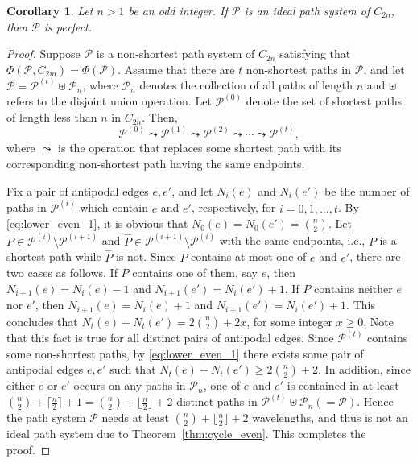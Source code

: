 \documentclass[journal,draftcls,onecolumn,12pt,twoside]{IEEEtran}
\newtheorem{corollary}[theorem]{\bf Corollary}
\begin{document}
\begin{corollary}\label{coro:even}
Let $n>1$ be an odd integer.
If $\mathcal{P}$ is an ideal path system of $C_{2n}$, then $\mathcal{P}$ is perfect.
\end{corollary}
\begin{proof}
Suppose $\mathcal{P}$ is a non-shortest path system of $C_{2n}$ satisfying that $\Phi(\mathcal{P},C_{2m})=\Phi(\mathcal{P})$.
Assume that there are $t$ non-shortest paths in $\mathcal{P}$, and let $\mathcal{P}=\mathcal{P}^{(t)}\uplus\mathcal{P}_n$, where $\mathcal{P}_n$ denotes the collection of all paths of length $n$ and $\uplus$ refers to the disjoint union operation.
Let $\mathcal{P}^{(0)}$ denote the set of shortest paths of length less than $n$ in $C_{2n}$.
Then, $$\mathcal{P}^{(0)}\leadsto\mathcal{P}^{(1)}\leadsto\mathcal{P}^{(2)}\leadsto\cdots\leadsto\mathcal{P}^{(t)},$$ where $\leadsto$ is the operation that replaces some shortest path with its corresponding non-shortest path having the same endpoints.


Fix a pair of antipodal edges $e,e'$, and let $N_i(e)$ and $N_i(e')$ be the number of paths in $\mathcal{P}^{(i)}$ which contain $e$ and $e'$, respectively, for $i=0,1,\ldots,t$.
By \eqref{eq:lower_even_1}, it is obvious that $N_0(e)=N_0(e')={n\choose 2}$. 
Let $P\in\mathcal{P}^{(i)}\setminus\mathcal{P}^{(i+1)}$ and $\widehat{P}\in\mathcal{P}^{(i+1)}\setminus\mathcal{P}^{(i)}$ with the same endpoints, i.e., $P$ is a shortest path while $\widehat{P}$ is not.
Since $P$ contains at most one of $e$ and $e'$, there are two cases as follows.
If $P$ contains one of them, say $e$, then $N_{i+1}(e)=N_i(e)-1$ and $N_{i+1}(e')=N_i(e')+1$.
If $P$ contains neither $e$ nor $e'$, then $N_{i+1}(e)=N_i(e)+1$ and $N_{i+1}(e')=N_i(e')+1$.
This concludes that $N_t(e)+N_t(e')=2{n\choose 2}+2x$, for some integer $x\geq 0$.
Note that this fact is true for all distinct pairs of antipodal edges.
Since $\mathcal{P}^{(t)}$ contains some non-shortest paths, by \eqref{eq:lower_even_1} there exists some pair of antipodal edges $e,e'$ such that $N_t(e)+N_t(e')\geq 2{n\choose 2}+2$.
In addition, since either $e$ or $e'$ occurs on any paths in $\mathcal{P}_n$, one of $e$ and $e'$ is contained in at least ${n\choose 2}+\lceil\frac{n}{2}\rceil+1={n\choose 2}+\lfloor\frac{n}{2}\rfloor+2$ distinct paths in $\mathcal{P}^{(t)}\uplus\mathcal{P}_n(=\mathcal{P})$.
Hence the path system $\mathcal{P}$ needs at least ${n\choose 2}+\lfloor\frac{n}{2}\rfloor+2$ wavelengths, and thus is not an ideal path system due to Theorem~\ref{thm:cycle_even}.
This completes the proof.
\end{proof}
\end{document}
